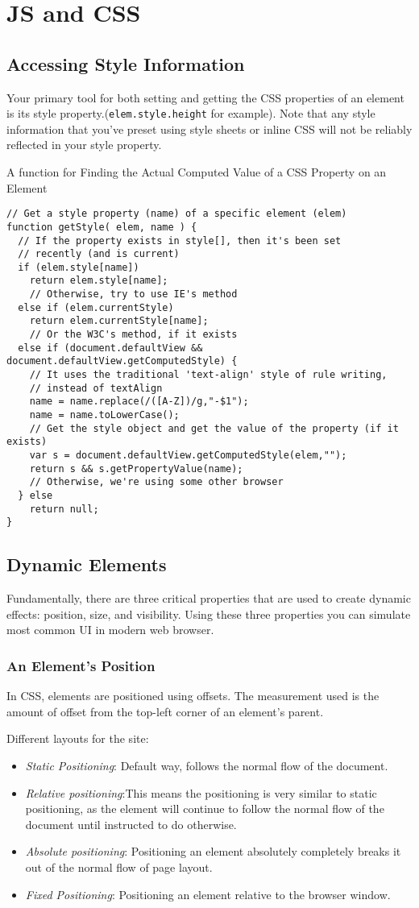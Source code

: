 \documentclass[a4paper,11pt]{book}
\begin{document}
\chapter{JS and CSS}
\section{Accessing Style Information}
Your primary tool for both setting and getting the CSS properties of an element
is its style property.(\verb|elem.style.height| for example). Note that any
style information that you've preset using style sheets or inline CSS will not
be reliably reflected in your style property.

A function for Finding the Actual Computed Value of a CSS Property on an Element
\begin{verbatim}
// Get a style property (name) of a specific element (elem)
function getStyle( elem, name ) {
  // If the property exists in style[], then it's been set
  // recently (and is current)
  if (elem.style[name])
    return elem.style[name];
    // Otherwise, try to use IE's method
  else if (elem.currentStyle)
    return elem.currentStyle[name];
    // Or the W3C's method, if it exists
  else if (document.defaultView && document.defaultView.getComputedStyle) {
    // It uses the traditional 'text-align' style of rule writing,
    // instead of textAlign
    name = name.replace(/([A-Z])/g,"-$1");
    name = name.toLowerCase();
    // Get the style object and get the value of the property (if it exists)
    var s = document.defaultView.getComputedStyle(elem,"");
    return s && s.getPropertyValue(name);
    // Otherwise, we're using some other browser
  } else
    return null;
}
\end{verbatim}
\section{Dynamic Elements}
Fundamentally, there are three critical properties that are used to create
dynamic effects: position, size, and visibility. Using these three properties
you can simulate most common UI in modern web browser.
\subsection{An Element's Position}
In CSS, elements are positioned using offsets. The measurement used is the
amount of offset from the top-left corner of an element's parent.

Different layouts for the site:
\begin{itemize}
\item \emph{Static Positioning}: Default way, follows the normal flow of the
document.
\item \emph{Relative positioning}:This means the positioning is very similar to
static positioning, as the element will continue to follow the normal flow of
the document until instructed to do otherwise.
\item \emph{Absolute positioning}: Positioning an element absolutely completely
breaks it out of the normal flow of page layout.
\item \emph{Fixed Positioning}: Positioning an element relative to the browser
window. 
\end{itemize}
\end{document}
